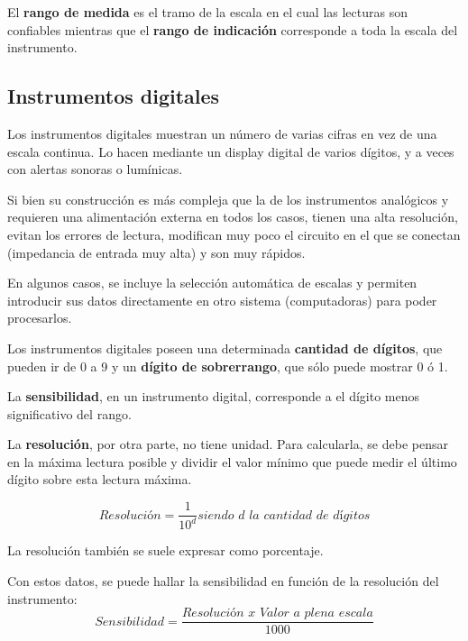 \begin{ejemplo}
El \textbf{rango de medida} es el tramo de la escala en el cual las lecturas son confiables mientras que el \textbf{rango de indicación} corresponde a toda la escala del instrumento.

\subsection{Instrumentos digitales}
	
Los instrumentos digitales muestran un número de varias cifras en vez de una escala continua. Lo hacen mediante un display digital de varios dígitos, y a veces con alertas sonoras o lumínicas.

Si bien su construcción es más compleja que la de los instrumentos analógicos y requieren una alimentación externa en todos los casos, tienen una alta resolución, evitan los errores de lectura, modifican muy poco el circuito en el que se conectan (impedancia de entrada muy alta) y son muy rápidos.

En algunos casos, se incluye la selección automática de escalas y permiten introducir sus datos directamente en otro sistema (computadoras) para poder procesarlos.

Los instrumentos digitales poseen una determinada \textbf{cantidad de dígitos}, que pueden ir de 0 a 9 y un \textbf{dígito de sobrerrango}, que sólo puede mostrar 0 ó 1.

La \textbf{sensibilidad}, en un instrumento digital, corresponde a el dígito menos significativo del rango.

La \textbf{resolución}, por otra parte, no tiene unidad. Para calcularla, se debe pensar en la máxima lectura posible y dividir el valor mínimo que puede medir el último dígito sobre esta lectura máxima.

$$ \textit{Resolución} = \frac{1}{10^{d}} \textit{siendo $d$ la cantidad de dígitos}$$

La resolución también se suele expresar como porcentaje.

Con estos datos, se puede hallar la sensibilidad en función de la resolución del instrumento:
$$ Sensibilidad = \frac{\textit{Resolución x Valor a plena escala}}{1000} $$
\end{ejemplo}